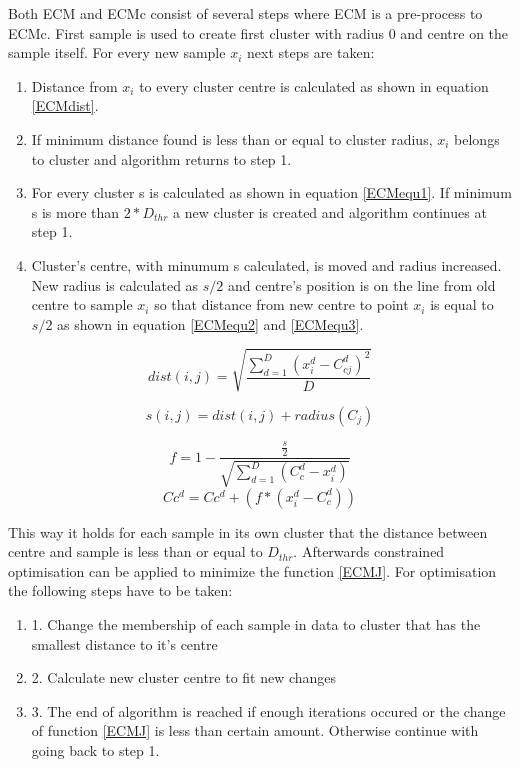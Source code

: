 \documentclass[conference]{IEEEtran}
\begin{document}
Both ECM and ECMc consist of several steps where ECM is a pre-process to ECMc. First sample is used to create first cluster with radius 0 and centre on the sample itself. For every new sample $x_i$ next steps are taken:
\begin{enumerate}
\item Distance from $x_i$ to every cluster centre is calculated as shown in equation \ref{ECMdist}.
\item If minimum distance found is less than or equal to cluster radius, $x_i$ belongs to cluster and algorithm returns to step 1.
\item For every cluster s is calculated as shown in equation \ref{ECMequ1}. If minimum s is more than $2*D_{thr}$ a new cluster is created and algorithm continues at step 1.
\item Cluster's centre, with minumum s calculated, is moved and radius increased. New radius is calculated as $s/2$ and centre's position is on the line from old centre to sample $x_i$ so that distance from new centre to point $x_i$ is equal to $s/2$ as shown in equation \ref{ECMequ2} and \ref{ECMequ3}.
\end{enumerate}

\begin{equation}\label{ECMdist}
dist(i,j) = \sqrt{ \frac {\sum_{d=1}^{D} (x_i^d - C_{cj}^d)^2} {D}}
\end{equation}

\begin{equation}\label{ECMequ1}
s(i, j) = dist(i,j) + radius(C_j)
\end{equation}

\begin{equation}\label{ECMequ2}
f = 1 - \frac {\frac {s} {2}} {\sqrt{ \sum_{d=1}^{D} (C_c^d - x_i^d)}}
\end{equation}
\begin{equation}\label{ECMequ3}
Cc^d = Cc^d + (f * (x_i^d - C_c^d))
\end{equation}

This way it holds for each sample in its own cluster that the distance between centre and sample is less than or equal to $D_{thr}$. Afterwards constrained optimisation can be applied to minimize the function \ref{ECMJ}. For optimisation the following steps have to be taken:
\begin{enumerate}
\item 1. Change the membership of each sample in data to cluster that has the smallest distance to it's centre
\item 2. Calculate new cluster centre to fit new changes
\item 3. The end of algorithm is reached if enough iterations occured or the change of function \ref{ECMJ} is less than certain amount. Otherwise continue with going back to step 1.
\end{enumerate}
\end{document}
